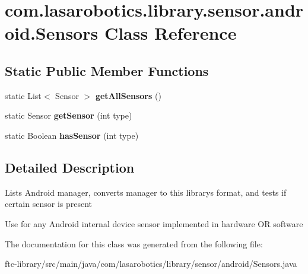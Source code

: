\hypertarget{classcom_1_1lasarobotics_1_1library_1_1sensor_1_1android_1_1_sensors}{}\section{com.\+lasarobotics.\+library.\+sensor.\+android.\+Sensors Class Reference}
\label{classcom_1_1lasarobotics_1_1library_1_1sensor_1_1android_1_1_sensors}
\subsection*{Static Public Member Functions}
\begin{DoxyCompactItemize}
\item 
\hypertarget{classcom_1_1lasarobotics_1_1library_1_1sensor_1_1android_1_1_sensors_a632da87e087bc969fd237ffebea49ff4}{}static List$<$ Sensor $>$ {\bfseries get\+All\+Sensors} ()\label{classcom_1_1lasarobotics_1_1library_1_1sensor_1_1android_1_1_sensors_a632da87e087bc969fd237ffebea49ff4}

\item 
\hypertarget{classcom_1_1lasarobotics_1_1library_1_1sensor_1_1android_1_1_sensors_abf64e300cb51466da078c1c952a8c818}{}static Sensor {\bfseries get\+Sensor} (int type)\label{classcom_1_1lasarobotics_1_1library_1_1sensor_1_1android_1_1_sensors_abf64e300cb51466da078c1c952a8c818}

\item 
\hypertarget{classcom_1_1lasarobotics_1_1library_1_1sensor_1_1android_1_1_sensors_a9e9eccb5e01be00865871b97fb899cd3}{}static Boolean {\bfseries has\+Sensor} (int type)\label{classcom_1_1lasarobotics_1_1library_1_1sensor_1_1android_1_1_sensors_a9e9eccb5e01be00865871b97fb899cd3}

\end{DoxyCompactItemize}


\subsection{Detailed Description}
Lists Android manager, converts manager to this library\textquotesingle{}s format, and tests if certain sensor is present

Use for any Android internal device sensor implemented in hardware O\+R software 

The documentation for this class was generated from the following file\+:\begin{DoxyCompactItemize}
\item 
ftc-\/library/src/main/java/com/lasarobotics/library/sensor/android/Sensors.\+java\end{DoxyCompactItemize}
